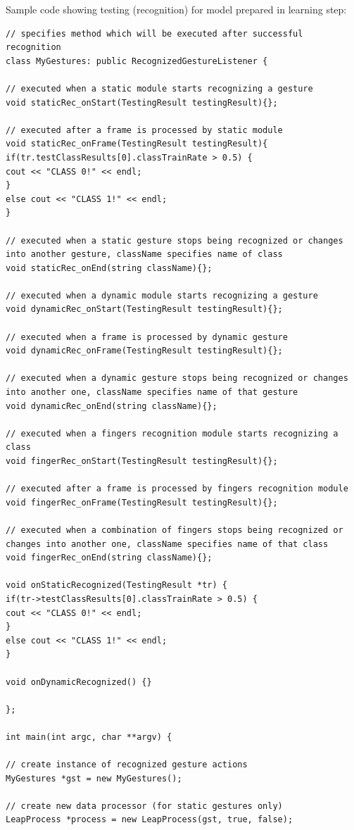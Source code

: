 Sample code showing testing (recognition) for model prepared in learning step:
\begin{lstlisting}
// specifies method which will be executed after successful recognition
class MyGestures: public RecognizedGestureListener {

// executed when a static module starts recognizing a gesture
void staticRec_onStart(TestingResult testingResult){};

// executed after a frame is processed by static module
void staticRec_onFrame(TestingResult testingResult){
if(tr.testClassResults[0].classTrainRate > 0.5) {
cout << "CLASS 0!" << endl;
}
else cout << "CLASS 1!" << endl;
}

// executed when a static gesture stops being recognized or changes into another gesture, className specifies name of class
void staticRec_onEnd(string className){};

// executed when a dynamic module starts recognizing a gesture
void dynamicRec_onStart(TestingResult testingResult){};

// executed when a frame is processed by dynamic gesture
void dynamicRec_onFrame(TestingResult testingResult){};

// executed when a dynamic gesture stops being recognized or changes into another one, className specifies name of that gesture
void dynamicRec_onEnd(string className){};

// executed when a fingers recognition module starts recognizing a class
void fingerRec_onStart(TestingResult testingResult){};

// executed after a frame is processed by fingers recognition module
void fingerRec_onFrame(TestingResult testingResult){};

// executed when a combination of fingers stops being recognized or changes into another one, className specifies name of that class
void fingerRec_onEnd(string className){};

void onStaticRecognized(TestingResult *tr) {
if(tr->testClassResults[0].classTrainRate > 0.5) {
cout << "CLASS 0!" << endl;
}
else cout << "CLASS 1!" << endl;
}

void onDynamicRecognized() {}

};

int main(int argc, char **argv) {

// create instance of recognized gesture actions
MyGestures *gst = new MyGestures();

// create new data processor (for static gestures only)
LeapProcess *process = new LeapProcess(gst, true, false);


\end{lstlisting}
